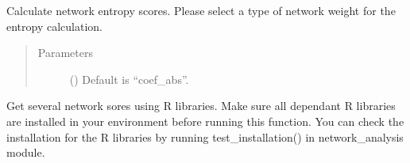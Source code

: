 \documentclass[letterpaper,10pt,english]{sphinxmanual}
\begin{document}
\begin{fulllineitems}
\begin{fulllineitems}
\begin{quote}
\begin{description}
\begin{itemize}
\end{itemize}

\end{description}\end{quote}

\end{fulllineitems}


\begin{fulllineitems}
\label{\detokenize{modules/celloracle:celloracle.Links.get_network_entropy}}
Calculate network entropy scores.
Please select a type of network weight for the entropy calculation.
\begin{quote}\begin{description}
\item[{Parameters}] \leavevmode
{} () \textendash{} Default is “coef\_abs”.

\end{description}\end{quote}

\end{fulllineitems}


\begin{fulllineitems}
\label{\detokenize{modules/celloracle:celloracle.Links.get_score}}
Get several network sores using R libraries.
Make sure all dependant R libraries are installed in your environment before running this function.
You can check the installation for the R libraries by running test\_installation() in network\_analysis module.

\end{fulllineitems}



\end{fulllineitems}
\end{document}
